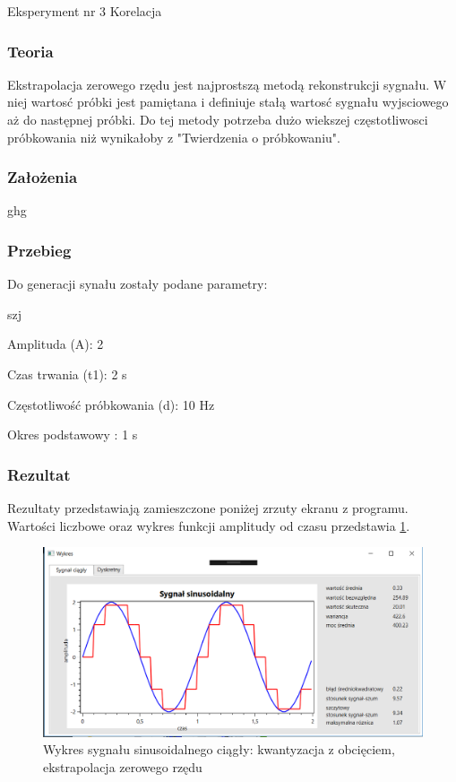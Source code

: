 \documentclass[12pt]{article}
\begin{document}
Eksperyment nr 3  Korelacja

\subsubsection{Teoria}
Ekstrapolacja zerowego rzędu jest najprostszą metodą rekonstrukcji sygnału. W  niej wartosć próbki jest pamiętana i definiuje stałą wartosć sygnału wyjsciowego aż do następnej próbki. Do tej metody potrzeba dużo wiekszej częstotliwosci próbkowania niż wynikałoby z "Twierdzenia o próbkowaniu". 

\subsubsection{Założenia}
ghg


\subsubsection{Przebieg}
Do generacji synału zostały podane parametry:

\begin{labeling}{szj}
\item [Amplituda (A):] 2
\item [Czas trwania (t1):] 2 s
\item [Częstotliwość próbkowania (d): ] 10 Hz
\item [Okres podstawowy :] 1 s
\end{labeling}


\subsubsection{Rezultat}

Rezultaty przedstawiają zamieszczone poniżej zrzuty ekranu z programu. Wartości liczbowe oraz wykres funkcji amplitudy od czasu przedstawia \ref{Wykres dla wyników eksperymentu trzeciego}.
\begin{figure}[h!]
 \centering
 \includegraphics[width=12.3cm]{SinKwantZaokrEkstA2T2f10H2t1C.PNG}
 \vspace{-0.3cm}
 \caption{Wykres sygnału sinusoidalnego ciągły: kwantyzacja z obcięciem, ekstrapolacja zerowego rzędu}
 \label{Wykres dla wyników eksperymentu trzeciego}
\end{figure}
\end{document}
